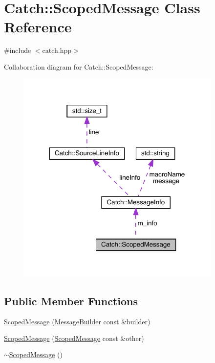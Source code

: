 \hypertarget{class_catch_1_1_scoped_message}{}\section{Catch\+:\+:Scoped\+Message Class Reference}
\label{class_catch_1_1_scoped_message}


{\ttfamily \#include $<$catch.\+hpp$>$}



Collaboration diagram for Catch\+:\+:Scoped\+Message\+:
\nopagebreak
\begin{figure}[H]
\begin{center}
\leavevmode
\includegraphics[width=288pt]{class_catch_1_1_scoped_message__coll__graph}
\end{center}
\end{figure}
\subsection*{Public Member Functions}
\begin{DoxyCompactItemize}
\item 
\hyperlink{class_catch_1_1_scoped_message_a5cc59f0f2ebe840e6607f83004d49a17}{Scoped\+Message} (\hyperlink{struct_catch_1_1_message_builder}{Message\+Builder} const \&builder)
\item 
\hyperlink{class_catch_1_1_scoped_message_ae03a17fd47220d563d4abc73e7518e29}{Scoped\+Message} (\hyperlink{class_catch_1_1_scoped_message}{Scoped\+Message} const \&other)
\item 
\hyperlink{class_catch_1_1_scoped_message_a43190843f9eeb84a0b42b0bc95fdf93a}{$\sim$\+Scoped\+Message} ()
\end{DoxyCompactItemize}

